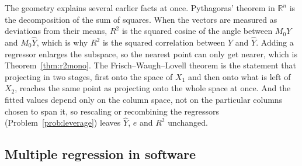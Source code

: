\documentclass[11pt,a4paper]{article}
\numberwithin{equation}{section}
\theoremstyle{definition}
\begin{document}
The geometry explains several earlier facts at once. Pythagoras' theorem in $\mathbb R^n$ is the decomposition of the sum of squares. When the
vectors are measured as deviations from their means, $R^2$ is the squared cosine of the angle between $M_0Y$ and $M_0\hat Y$, which is why $R^2$
is the squared correlation between $Y$ and $\hat Y$. Adding a regressor enlarges the subspace, so the nearest point can only get nearer, which is
Theorem~\ref{thm:r2mono}. The Frisch--Waugh--Lovell theorem is the statement that projecting in two stages, first onto the space of $X_1$ and then
onto what is left of $X_2$, reaches the same point as projecting onto the whole space at once. And the fitted values depend only on the column
space, not on the particular columns chosen to span it, so rescaling or recombining the regressors (Problem~\ref{prob:leverage}) leaves
$\hat Y$, $e$ and $R^2$ unchanged.

\subsection{Multiple regression in software}
\label{ssec:software6}
\end{document}
